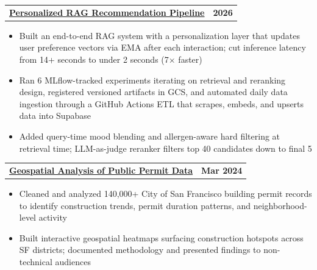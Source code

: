 \documentclass[letterpaper,11pt]{article}
\makeatletter
\newcommand{\resumeItem}[1]{
  \item\small{
    {#1 \vspace{-3pt}}
  }
}
\newcommand{\resumeProjectHeading}[2]{
  \vspace{-3pt}\item
    \begin{tabular*}{1.0\textwidth}[t]{l@{\extracolsep{\fill}}r}
      \textbf{#1} & \textbf{\small #2} \\
    \end{tabular*}\vspace{-7pt}
}
\newcommand{\resumeItemListStart}{\begin{itemize}}
\newcommand{\resumeItemListEnd}{\end{itemize}\vspace{0pt}}
\makeatother
\begin{document}
    \resumeProjectHeading
    {\href{https://github.com/andrewtclim/lunch_buddy}{Personalized RAG Recommendation Pipeline} \normalfont{(Python, Gemini, pgvector, FastAPI, MLflow, GCP)}}{2026}
    \resumeItemListStart
        \resumeItem{Built an end-to-end RAG system with a personalization layer that updates user preference vectors via EMA after each interaction; cut inference latency from 14+ seconds to under 2 seconds (7$\times$ faster)}
        \resumeItem{Ran 6 MLflow-tracked experiments iterating on retrieval and reranking design, registered versioned artifacts in GCS, and automated daily data ingestion through a GitHub Actions ETL that scrapes, embeds, and upserts data into Supabase}
        \resumeItem{Added query-time mood blending and allergen-aware hard filtering at retrieval time; LLM-as-judge reranker filters top 40 candidates down to final 5}
    \resumeItemListEnd

    \resumeProjectHeading
    {\href{https://docs.google.com/presentation/d/1pG8CtHSJRCOxtvXxa5YsXvHFEM7j1VPeoAH7LcZscWc/edit?usp=sharing}{Geospatial Analysis of Public Permit Data} \normalfont{(Python, Pandas, Folium, Seaborn)}}{Mar 2024}
    \resumeItemListStart
        \resumeItem{Cleaned and analyzed 140,000+ City of San Francisco building permit records to identify construction trends, permit duration patterns, and neighborhood-level activity}
        \resumeItem{Built interactive geospatial heatmaps surfacing construction hotspots across SF districts; documented methodology and presented findings to non-technical audiences}
    \resumeItemListEnd
\end{document}
